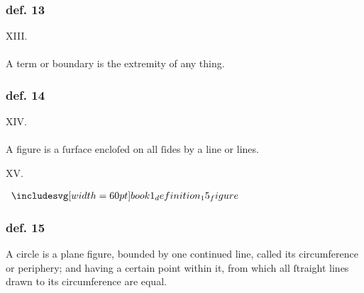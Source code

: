 \hfill

\begin{minipage}{0.165\textwidth}
    \phantom{}
\end{minipage}%
\begin{minipage}{0.67\textwidth}
    \subsubsection{def. 13}
    \begin{center}
        XIII.\label{book1def13}\\
        \hfill\\
        A term or boundary is the extremity of any thing.
    \end{center}
    \subsubsection{def. 14}
    \begin{center}
        XIV.\label{book1def14}\\
        \hfill\\
        A figure is a ſurface encloſed on all ſides by a line or lines.
    \end{center}
\end{minipage}%
\begin{minipage}{0.165\textwidth}
    \phantom{}
\end{minipage}%


\hfill

\begin{center}
    XV.\label{book1def15}\\
\end{center}
\begin{minipage}{0.33\textwidth}
    \begin{center}
        $\img[0][0][60]{book1_definition_15_figure}$
    \end{center}
\end{minipage}%
\begin{minipage}{0.67\textwidth}
    \subsubsection{def. 15}
    \begin{center}
        \raggedright A circle is a plane figure, bounded by one continued line, called its circumference or periphery; and having a certain point within it, from which all ſtraight lines drawn to its circumference are equal.
    \end{center}
\end{minipage}

